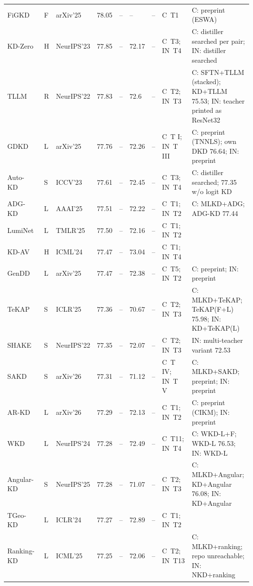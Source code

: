 {\begin{longtable}{@{}lllllll>{\raggedright\arraybackslash}p{1.5cm}>{\raggedright\arraybackslash}p{3.8cm}@{}}
FiGKD~\citep{kim2025figkd} & F & arXiv'25 & 78.05 & -- & -- & -- & C~T1 & C: preprint (ESWA) \\
KD-Zero~\citep{li2023kdzero} & H & NeurIPS'23 & 77.85 & -- & 72.17 & -- & C~T3; IN~T4 & C: distiller searched per pair; IN: distiller searched \\
TLLM~\citep{zhu2022tllm} & R & NeurIPS'22 & 77.83 & -- & 72.6 & -- & C~T2; IN~T3 & C: SFTN+TLLM (stacked); KD+TLLM 75.53; IN: teacher printed as ResNet32 \\
GDKD~\citep{zheng2025gdkd} & L & arXiv'25 & 77.76 & -- & 72.26 & -- & C~T I; IN~T III & C: preprint (TNNLS); own DKD 76.64; IN: preprint \\
Auto-KD~\citep{li2023autokd} & S & ICCV'23 & 77.61 & -- & 72.45 & -- & C~T3; IN~T4 & C: distiller searched; 77.35 w/o logit KD \\
ADG-KD~\citep{li2025adgkd} & L & AAAI'25 & 77.51 & -- & 72.22 & -- & C~T1; IN~T2 & C: MLKD+ADG; ADG-KD 77.44 \\
LumiNet~\citep{hossain2025luminet} & L & TMLR'25 & 77.50 & -- & 72.16 & -- & C~T1; IN~T2 &  \\
KD-AV~\citep{peng2024kdav} & H & ICML'24 & 77.47 & -- & 73.04 & -- & C~T1; IN~T4 &  \\
GenDD~\citep{cui2025gendd} & L & arXiv'25 & 77.47 & -- & 72.38 & -- & C~T5; IN~T2 & C: preprint; IN: preprint \\
TeKAP~\citep{hossain2025tekap} & S & ICLR'25 & 77.36 & -- & 70.67 & -- & C~T2; IN~T3 & C: MLKD+TeKAP; TeKAP(F+L) 75.98; IN: KD+TeKAP(L) \\
SHAKE~\citep{li2022shake} & S & NeurIPS'22 & 77.35 & -- & 72.07 & -- & C~T2; IN~T3 & IN: multi-teacher variant 72.53 \\
SAKD~\citep{yu2026sakd} & S & arXiv'26 & 77.31 & -- & 71.12 & -- & C~T IV; IN~T V & C: MLKD+SAKD; preprint; IN: preprint \\
AR-KD~\citep{jiang2026arkd} & L & arXiv'26 & 77.29 & -- & 72.13 & -- & C~T1; IN~T2 & C: preprint (CIKM); IN: preprint \\
WKD~\citep{lv2024wkd} & L & NeurIPS'24 & 77.28 & -- & 72.49 & -- & C~T11; IN~T4 & C: WKD-L+F; WKD-L 76.53; IN: WKD-L \\
Angular-KD~\citep{yu2025angularkd} & S & NeurIPS'25 & 77.28 & -- & 71.07 & -- & C~T2; IN~T3 & C: MLKD+Angular; KD+Angular 76.08; IN: KD+Angular \\
TGeo-KD~\citep{hu2024tgeokd} & L & ICLR'24 & 77.27 & -- & 72.89 & -- & C~T1; IN~T2 &  \\
Ranking-KD~\citep{guan2025rankingkd} & L & ICML'25 & 77.25 & -- & 72.06 & -- & C~T2; IN~T13 & C: MLKD+ranking; repo unreachable; IN: NKD+ranking \\

\end{longtable}}

